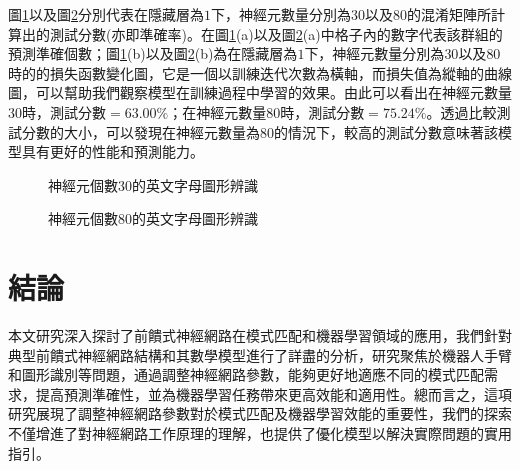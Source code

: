 \documentclass[12pt, a4paper]{article}
\begin{document}
圖\;\ref{fig:parallel_7}\;以及圖\;\ref{fig:parallel_8}\;分別代表在隱藏層為\;$1$\;下，神經元數量分別為\;$30$\;以及\;$80$\;的混淆矩陣所計算出的測試分數(亦即準確率)。在圖\;\ref{fig:parallel_7}\;(a)以及圖\;\ref{fig:parallel_8}\;(a)中格子內的數字代表該群組的預測準確個數；圖\;\ref{fig:parallel_7}\;(b)以及圖\;\ref{fig:parallel_8}\;(b)為在隱藏層為\;$1$\;下，神經元數量分別為\;$30$\;以及\;$80$\;時的的損失函數變化圖，它是一個以訓練迭代次數為橫軸，而損失值為縱軸的曲線圖，可以幫助我們觀察模型在訓練過程中學習的效果。由此可以看出在神經元數量\;$30$\;時，測試分數\;$=63.00\%$\;；在神經元數量\;$80$\;時，測試分數\;$=75.24\%$。透過比較測試分數的大小，可以發現在神經元數量為\;$80$\;的情況下，較高的測試分數意味著該模型具有更好的性能和預測能力。

\begin{figure}[H]
\centering
{}
\caption{神經元個數\;$30$\;的英文字母圖形辨識}
\label{fig:parallel_7}
\end{figure}

\begin{figure}[H]
\centering
{}
\caption{神經元個數\;$80$\;的英文字母圖形辨識}
\label{fig:parallel_8}
\end{figure}


\section{結論}
本文研究深入探討了前饋式神經網路在模式匹配和機器學習領域的應用，我們針對典型前饋式神經網路結構和其數學模型進行了詳盡的分析，研究聚焦於機器人手臂和圖形識別等問題，通過調整神經網路參數，能夠更好地適應不同的模式匹配需求，提高預測準確性，並為機器學習任務帶來更高效能和適用性。總而言之，這項研究展現了調整神經網路參數對於模式匹配及機器學習效能的重要性，我們的探索不僅增進了對神經網路工作原理的理解，也提供了優化模型以解決實際問題的實用指引。
\end{document}
